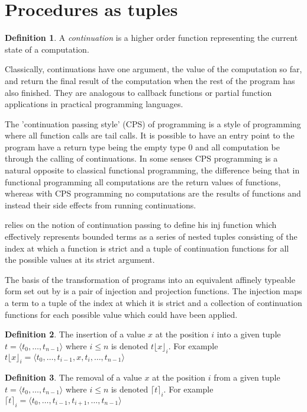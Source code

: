 \documentclass[12pt,a4paper]{report}
\theoremstyle{definition}
\newtheorem{definition}{Definition}[chapter]%
\theoremstyle{remark}
\begin{document}
\section{Procedures as tuples}
\begin{definition}
    A \emph{continuation} is a higher order function representing the current state of a computation.
    
    Classically, continuations have one argument, the value of the computation so far, and return the final result of the computation when the rest of the program has also finished. They are analogous to callback functions or partial function applications in practical programming languages. 
\end{definition}

The 'continuation passing style' (CPS) of programming is a style of programming where all function calls are tail calls. It is possible to have an entry point to the program have a return type being the empty type $0$ and all computation be through the calling of continuations. In some senses CPS programming is a natural opposite to classical functional programming, the difference being that in functional programming all computations are the return values of functions, whereas with CPS programming no computations are the results of functions and instead their side effects from running continuations.

\cite{laird_2007} relies on the notion of continuation passing to define his inj function which effectively represents bounded terms as a series of nested tuples consisting of the index at which a function is strict and a tuple of continuation functions for all the possible values at its strict argument. 

The basis of the transformation of programs into an equivalent affinely typeable form set out by \cite{laird_2007} is a pair of injection and projection functions. The injection maps a term to a tuple of the index at which it is strict and a collection of continuation functions for each possible value which could have been applied.  

\begin{definition}
    The insertion of a value $x$ at the position $i$ into a given tuple $t = \langle t_0, \dots, t_{n-1} \rangle$ where $i \leq n$ is denoted $t\lfloor x \rfloor_i$. For example $t\lfloor x \rfloor_i = \langle t_0, \dots, t_{i-1}, x, t_i, \dots, t_{n-1} \rangle$
\end{definition}

\begin{definition}
    The removal of a value $x$ at the position $i$ from a given tuple $t = \langle t_0, \dots, t_{n-1} \rangle$ where $i \le n$ is denoted $\lceil t \rceil_i$. For example $\lceil t \rceil_i = \langle t_0, \dots, t_{i-1}, t_{i+1}, \dots, t_{n-1} \rangle$
\end{definition}
\end{document}

